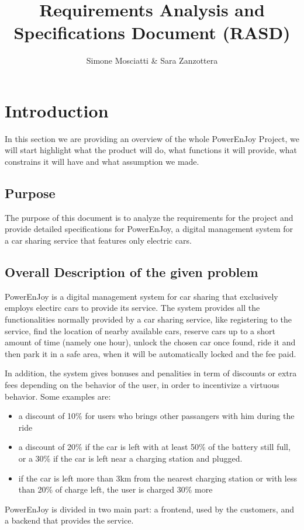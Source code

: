 \documentclass[11pt]{article} %
\title{Requirements Analysis and Specifications Document (RASD)}
\author{Simone Mosciatti \& Sara Zanzottera}
\newcommand{\pe}{PowerEnJoy }
\newcommand{\pecomma}{PowerEnJoy, }
\begin{document}
\maketitle
\newpage
\tableofcontents
\newpage


\section{Introduction}

In this section we are providing an overview of the whole \pe Project, we will start highlight what the product will do, what functions it will provide, what constrains it will have and what assumption we made.

  \subsection{Purpose}
  
The purpose of this document is to analyze the requirements for the project and provide detailed specifications for \pecomma a digital management system for a car sharing service that features only electric cars. 
  

  \subsection{Overall Description of the given problem}

\pe is a digital management system for car sharing that exclusively employs electirc cars to provide its service. The system provides all the functionalities normally provided by a car sharing service, like registering to the service, find the location of nearby available cars, reserve cars up to a short amount of time (namely one hour), unlock the chosen car once found, ride it and then park it in a safe area, when it will be automatically locked and the fee paid.

In addition, the system gives bonuses and penalities in term of discounts or extra fees depending on the behavior of the user, in order to incentivize a virtuous behavior. Some examples are:
\begin{itemize}
\item a discount of 10\% for users who brings other passangers with him during the ride
\item a discount of 20\% if the car is left with at least 50\% of the battery still full, or a 30\% if the car is left near a charging station and plugged.
\item if the car is left more than 3km from the nearest charging station or with less than 20\% of charge left, the user is charged 30\% more
\end{itemize}
  \pe is divided in two main part: a frontend, used by the customers, and a backend that provides the service.
\end{document}
